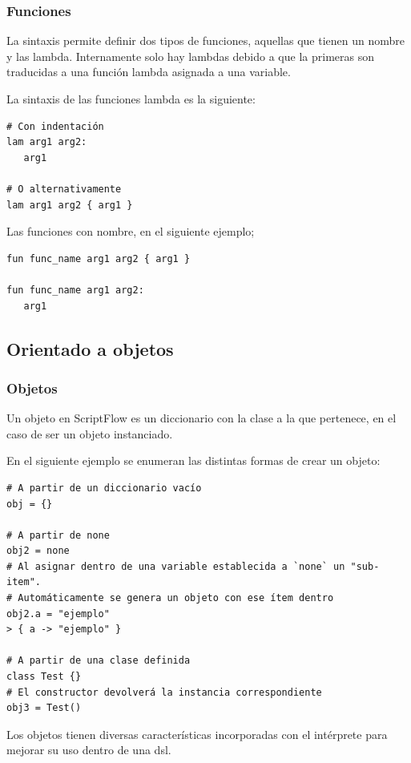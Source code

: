 \documentclass[11pt]{article}
\begin{document}
\subsubsection{Funciones}
\label{sec:orgff5f1b5}

La sintaxis permite definir dos tipos de funciones, aquellas que tienen un nombre y las lambda. Internamente solo hay lambdas debido
a que la primeras son traducidas a una función lambda asignada a una variable.

La sintaxis de las funciones lambda es la siguiente:
\begin{verbatim}
# Con indentación
lam arg1 arg2:
   arg1

# O alternativamente
lam arg1 arg2 { arg1 }
\end{verbatim}

Las funciones con nombre, en el siguiente ejemplo;
\begin{verbatim}
fun func_name arg1 arg2 { arg1 }

fun func_name arg1 arg2:
   arg1
\end{verbatim}

\subsection{Orientado a objetos}
\label{sec:org467ac3d}

\subsubsection{Objetos}
\label{sec:orgae27b1a}
Un objeto en ScriptFlow es un diccionario con la clase a la que pertenece, en el caso de ser
un objeto instanciado.

En el siguiente ejemplo se enumeran las distintas formas de crear un objeto:

\begin{verbatim}
# A partir de un diccionario vacío
obj = {}

# A partir de none
obj2 = none
# Al asignar dentro de una variable establecida a `none` un "sub-item".
# Automáticamente se genera un objeto con ese ítem dentro
obj2.a = "ejemplo"
> { a -> "ejemplo" }

# A partir de una clase definida
class Test {}
# El constructor devolverá la instancia correspondiente
obj3 = Test()
\end{verbatim}

Los objetos tienen diversas características incorporadas con el intérprete para mejorar su uso dentro de una \gls{dsl}.
\end{document}
